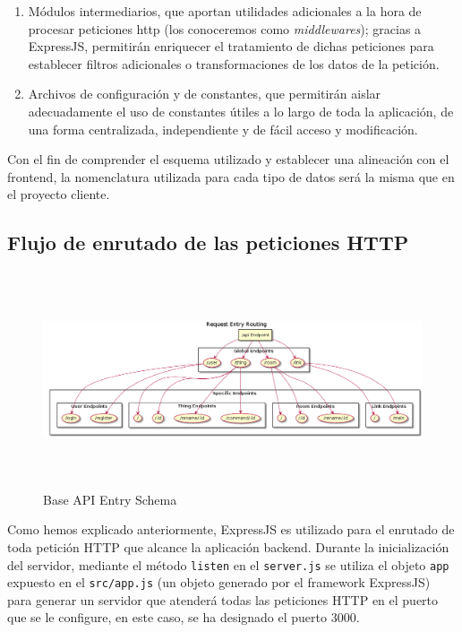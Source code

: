 \begin{enumerate}
 \item Módulos intermediarios, que aportan utilidades adicionales a la hora de procesar peticiones http (los conoceremos como \textit{middlewares}); gracias a ExpressJS, permitirán enriquecer el tratamiento de dichas peticiones para establecer filtros adicionales o transformaciones de los datos de la petición.
 \item Archivos de configuración y de constantes, que permitirán aislar adecuadamente el uso de constantes útiles a lo largo de toda la aplicación, de una forma centralizada, independiente y de fácil acceso y modificación.
\end{enumerate}

\vspace{0.5cm}

Con el fin de comprender el esquema utilizado y establecer una alineación con el frontend, la nomenclatura utilizada para cada tipo de datos será la misma que en el proyecto cliente.

\subsection{Flujo de enrutado de las peticiones HTTP}
\label{ch:Capitulo4.8.3}

\begin{figure}[hbt!]
\centering
\includegraphics[height=2.5in]{figures/diagrams/back/router-flow/api-entry.png}
\caption[api-entry]{Base API Entry Schema\footnotemark}
\label{fig:back-api-entry}
\end{figure}

Como hemos explicado anteriormente, ExpressJS es utilizado para el enrutado de toda petición HTTP que alcance la aplicación backend. Durante la inicialización del servidor, mediante el método \verb|listen| en el \verb|server.js| se utiliza el objeto \verb|app| expuesto en el \verb|src/app.js| (un objeto generado por el framework ExpressJS) para generar un servidor que atenderá todas las peticiones HTTP en el puerto que se le configure, en este caso, se ha designado el puerto 3000.

